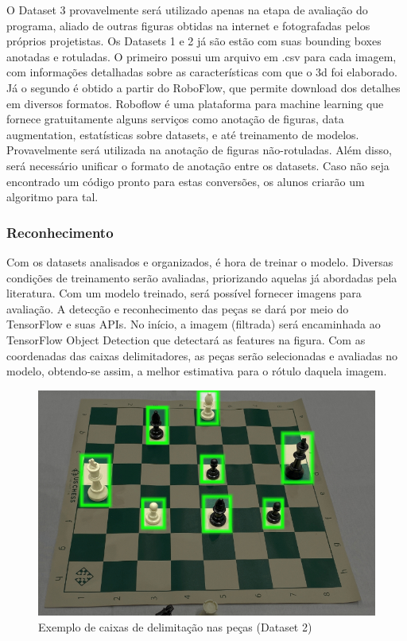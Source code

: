 \documentclass[a4paper,12pt,twoside]{article}
\begin{document}
O Dataset 3 provavelmente será utilizado apenas na etapa de avaliação do programa,
aliado de outras figuras obtidas na internet e fotografadas pelos próprios projetistas.
Os Datasets 1 e 2 já são estão com suas bounding boxes anotadas e rotuladas.
O primeiro possui um arquivo em .csv para cada imagem,
com informações detalhadas sobre as características com que o 3d foi elaborado.
Já o segundo é obtido a partir do RoboFlow, que permite download dos detalhes em diversos formatos.
Roboflow é uma plataforma para machine learning que fornece gratuitamente alguns serviços como anotação de figuras,
data augmentation, estatísticas sobre datasets, e até treinamento de modelos.
Provavelmente será utilizada na anotação de figuras não-rotuladas.
Além disso, será necessário unificar o formato de anotação entre os datasets.
Caso não seja encontrado um código pronto para estas conversões, os alunos criarão um algoritmo para tal.

\subsubsection{Reconhecimento}

Com os datasets analisados e organizados, é hora de treinar o modelo.
Diversas condições de treinamento serão avaliadas, priorizando aquelas já abordadas pela literatura.
Com um modelo treinado, será possível fornecer imagens para avaliação.
A detecção e reconhecimento das peças se dará por meio do TensorFlow e suas APIs.
No início, a imagem (filtrada) será encaminhada ao TensorFlow Object Detection que detectará as features na figura.
Com as coordenadas das caixas delimitadores,
as peças serão selecionadas e avaliadas no modelo, obtendo-se assim, a melhor estimativa para o rótulo daquela imagem.

\begin{figure}[h!]
\centering
  \includegraphics[width=\linewidth]{fig/delimitar.jpg}
  \caption{Exemplo de caixas de delimitação nas peças (Dataset 2)}
\label{fig:delimitar}
\end{figure}
\end{document}
